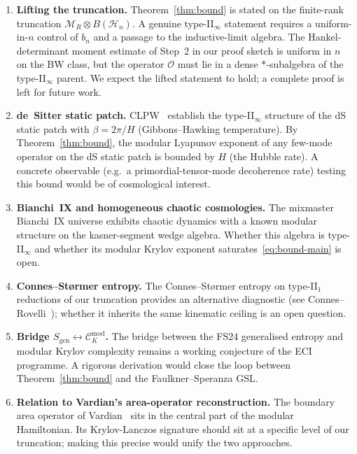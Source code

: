 \documentclass[12pt,a4paper]{article}
\begin{document}
\begin{enumerate}
\item \textbf{Lifting the truncation.}
Theorem~\ref{thm:bound} is stated on the finite-rank truncation
$\mathcal{M}_R \otimes B(\mathcal{H}_n)$.
A genuine type-II$_\infty$ statement requires a uniform-in-$n$
control of $b_n$ and a passage to the inductive-limit algebra.
The Hankel-determinant moment estimate of Step~2 in our proof
sketch is uniform in $n$ on the BW class, but the operator
$\mathcal{O}$ must lie in a dense $\ast$-subalgebra of the
type-II$_\infty$ parent.
We expect the lifted statement to hold; a complete proof is
left for future work.

\item \textbf{de~Sitter static patch.}
CLPW~\cite{CLPW2023} establish the type-II$_\infty$ structure
of the dS static patch with $\beta = 2\pi/H$ (Gibbons--Hawking
temperature).
By Theorem~\ref{thm:bound}, the modular Lyapunov exponent of
any few-mode operator on the dS static patch is bounded by
$H$ (the Hubble rate).
A concrete observable (e.g.\ a primordial-tensor-mode decoherence
rate) testing this bound would be of cosmological interest.

\item \textbf{Bianchi~IX and homogeneous chaotic cosmologies.}
The mixmaster Bianchi~IX universe exhibits chaotic dynamics with
a known modular structure on the kasner-segment wedge algebra.
Whether this algebra is type-II$_\infty$ and whether its modular
Krylov exponent saturates~\eqref{eq:bound-main} is open.

\item \textbf{Connes--St\o{}rmer entropy.}
The Connes--St\o{}rmer entropy on type-II$_1$ reductions of our
truncation provides an alternative diagnostic
(see Connes--Rovelli~\cite{ConnesRovelli1994}); whether it
inherits the same kinematic ceiling is an open question.

\item \textbf{Bridge $S_{\mathrm{gen}} \leftrightarrow
\mathcal{C}_K^{\mathrm{mod}}$.}
The bridge between the FS24 generalised entropy and modular
Krylov complexity remains a working conjecture of the ECI
programme.
A rigorous derivation would close the loop between
Theorem~\ref{thm:bound} and the Faulkner--Speranza GSL.

\item \textbf{Relation to Vardian's area-operator reconstruction.}
The boundary area operator of Vardian~\cite{Vardian2026} sits in
the central part of the modular Hamiltonian.
Its Krylov-Lanczos signature should sit at a specific level of
our truncation; making this precise would unify the two approaches.
\end{enumerate}
\end{document}
